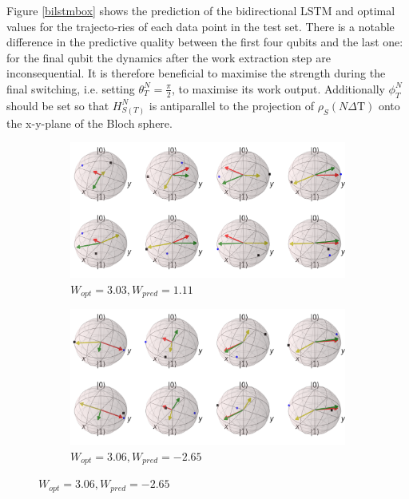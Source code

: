 Figure \ref{bilstmbox} shows the prediction of the bidirectional LSTM and optimal values for the trajecto-ries of each data point in the test set.
There is a notable difference in the predictive quality between the first four qubits and the last one: for the final qubit the dynamics after the work extraction step are inconsequential.
It is therefore beneficial to maximise the strength during the final switching, i.e. setting $\theta_T^N = \frac{\pi}{2}$, to maximise its work output.
Additionally $\phi_T^N$ should be set so that $H_{S(T)}^N$ is antiparallel to the projection of $\rho_S(N \Delta \mathrm{T})$ onto the x-y-plane of the Bloch sphere.

\newpage

\begin{figure}[H]
	\centering
	\begin{subfigure}{0.85\textwidth}
		\centering
		\includegraphics[width=\textwidth]{img/bloch_10553_crop_sphere2}
		\caption{$W_{opt} = 3.03, W_{pred} = 1.11$}
		\label{bloch_10553}
	\end{subfigure}
	\begin{subfigure}{0.85\textwidth}
		\centering
		\includegraphics[width=\textwidth]{img/bloch_worst_crop_sphere2}
		\caption{$W_{opt} = 3.06, W_{pred} = -2.65$}
		\label{bloch_worst}

\end{subfigure}
\end{figure}
